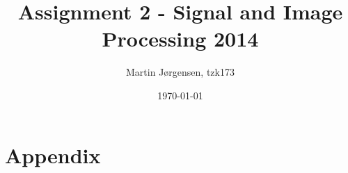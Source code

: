 \documentclass[a4paper,12pt]{article}
\title{Assignment 2 - Signal and Image Processing 2014}
\author{Martin Jørgensen, tzk173}
\date{\today}
\begin{document}
\maketitle

\tableofcontents
\pagebreak




\appendix
\section{Appendix}

\end{document}
